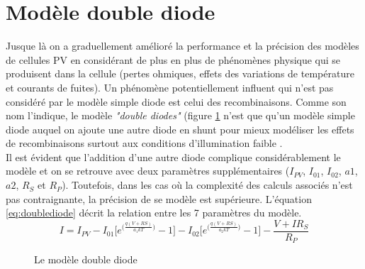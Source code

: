 \section{Modèle double diode}

Jusque là on a graduellement amélioré la performance et la précision des modèles de cellules PV en considérant de plus en plus de phénomènes physique qui se produisent dans la cellule (pertes ohmiques, effets des variations de température et courants de fuites). Un phénomène potentiellement influent qui n'est pas considéré par le modèle simple diode est celui des recombinaisons. Comme son nom l'indique, le modèle \textit{"double diodes"} (figure \ref{fig:doublediode} n'est que qu'un modèle simple diode auquel on ajoute une autre diode en shunt pour mieux modéliser les effets de recombinaisons surtout aux conditions d'illumination faible \cite{Chin2015b}.\\
Il est évident que l'addition d'une autre diode complique considérablement le modèle et on se retrouve avec deux paramètres supplémentaires ($I_{PV}$, $I_{01}$, $I_{02}$, $a1$, $a2$, $R_S$ et $R_P$). Toutefois, dans les cas où la complexité des calculs associés n'est pas contraignante, la précision de se modèle est supérieure. L'équation \ref{eq:doublediode} décrit la relation entre les 7 paramètres du modèle.
\begin{equation}
  \label{eq:doublediode}
  I = I_{PV} - I_{01} \bigg[e^{\big(\frac{q(V + RS)}{a_1kT}\big)} - 1\bigg] - I_{02} \bigg[e^{\big(\frac{q(V + RS)}{a_2kT}\big)} - 1\bigg] - \frac{V + I R_S}{R_P}
\end{equation}
\begin{figure}
  \begin{center}
    \shorthandoff{:!}
    \shorthandon{:!}
    \caption{Le modèle double diode}
    \label{fig:doublediode}
  \end{center}
\end{figure}

